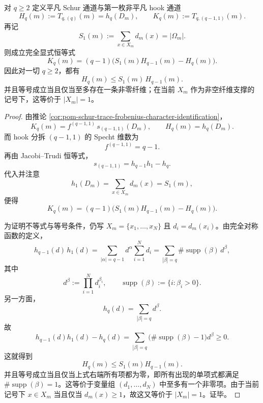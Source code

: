 \begin{theorem}\label{thm:xi-time-part63a-hook-channel-closed-difference-law}
对 \(q\ge 2\) 定义平凡 Schur 通道与第一枚非平凡 hook 通道
\[
H_q(m):=T_{q,(q)}(m)=h_q(D_m),
\qquad
K_q(m):=T_{q,(q-1,1)}(m).
\]
再记
\[
S_1(m):=\sum_{x\in X_m}d_m(x)=|\Omega_m|.
\]
则成立完全显式恒等式
\[
\boxed{\;
K_q(m)=(q-1)\bigl(S_1(m)H_{q-1}(m)-H_q(m)\bigr).\;}
\]
因此对一切 \(q\ge 2\)，都有
\[
\boxed{\;
H_q(m)\le S_1(m)\,H_{q-1}(m).\;}
\]
并且等号成立当且仅当至多存在一条非零纤维；在当前 \(X_m\) 作为非空纤维支撑的记号下，这等价于 \(|X_m|=1\)。
\end{theorem}
\begin{proof}
由推论 \ref{cor:pom-schur-trace-frobenius-character-identification}，
\[
K_q(m)=f^{(q-1,1)}\,s_{(q-1,1)}(D_m),
\qquad
H_q(m)=h_q(D_m).
\]
而 hook 分拆 \((q-1,1)\) 的 Specht 维数为
\[
f^{(q-1,1)}=q-1.
\]
再由 Jacobi--Trudi 恒等式，
\[
s_{(q-1,1)}=h_{q-1}h_1-h_q.
\]
代入并注意
\[
h_1(D_m)=\sum_{x\in X_m}d_m(x)=S_1(m),
\]
便得
\[
K_q(m)=(q-1)\bigl(S_1(m)H_{q-1}(m)-H_q(m)\bigr).
\]

为证明不等式与等号条件，仍写 \(X_m=\{x_1,\dots,x_N\}\) 且 \(d_i=d_m(x_i)\)。由完全对称函数的定义，
\[
h_{q-1}(d)\,h_1(d)
=
\sum_{|\alpha|=q-1}d^\alpha\sum_{i=1}^{N}d_i
=
\sum_{|\beta|=q}\#\operatorname{supp}(\beta)\,d^\beta,
\]
其中
\[
d^\beta:=\prod_{i=1}^{N}d_i^{\beta_i},
\qquad
\operatorname{supp}(\beta):=\{i:\beta_i>0\}.
\]
另一方面，
\[
h_q(d)=\sum_{|\beta|=q}d^\beta.
\]
故
\[
h_{q-1}(d)h_1(d)-h_q(d)
=
\sum_{|\beta|=q}\bigl(\#\operatorname{supp}(\beta)-1\bigr)d^\beta\ge 0.
\]
这就得到
\[
H_q(m)\le S_1(m)H_{q-1}(m).
\]
并且等号成立当且仅当上式右端所有项都为零，即所有出现的单项式都满足 \(\#\operatorname{supp}(\beta)=1\)。这等价于变量组 \((d_1,\dots,d_N)\) 中至多有一个非零项。由于当前记号下 \(x\in X_m\) 当且仅当 \(d_m(x)\ge 1\)，故这又等价于 \(|X_m|=1\)。证毕。
\end{proof}


